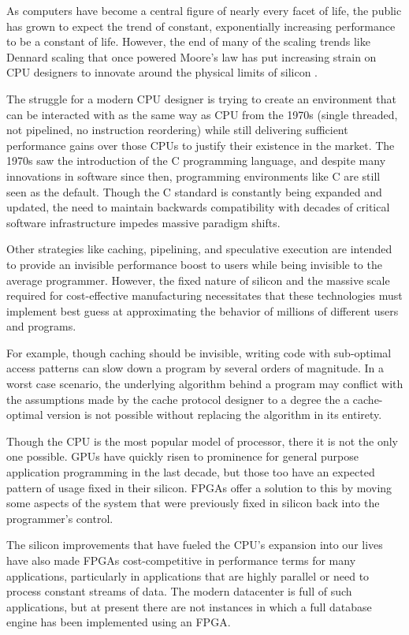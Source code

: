 
As computers have become a central figure of nearly every facet of life, the
public has grown to expect the trend of constant, exponentially increasing
performance to be a constant of life. However, the end of many of the scaling
trends like Dennard scaling that once powered Moore's law has put increasing
strain on CPU designers to innovate around the physical limits of silicon
\autocite{dark-silicon}.

The struggle for a modern CPU designer is trying to create an environment that
can be interacted with as the same way as CPU from the 1970s (single threaded,
not pipelined, no instruction reordering) while still delivering sufficient
performance gains over those CPUs to justify their existence in the market. The
1970s saw the introduction of the C programming language, and despite many
innovations in software since then, programming environments like C are still
seen as the default. Though the C standard is constantly being expanded and
updated, the need to maintain backwards compatibility with decades of critical
software infrastructure impedes massive paradigm shifts.

Other strategies like caching, pipelining, and speculative execution are
intended to provide an invisible performance boost to users while being
invisible to the average programmer. However, the fixed nature of silicon and
the massive scale required for cost-effective manufacturing necessitates that
these technologies must implement best guess at approximating the behavior of
millions of different users and programs.

For example, though caching should be invisible, writing code with sub-optimal
access patterns can slow down a program by several orders of magnitude. In a
worst case scenario, the underlying algorithm behind a program may conflict with
the assumptions made by the cache protocol designer to a degree the a
cache-optimal version is not possible without replacing the algorithm in its
entirety.

Though the CPU is the most popular model of processor, there it is not the only
one possible. GPUs have quickly risen to prominence for general purpose
application programming in the last decade, but those too have an expected
pattern of usage fixed in their silicon. FPGAs offer a solution to this by
moving some aspects of the system that were previously fixed in silicon back
into the programmer's control.

The silicon improvements that have fueled the CPU's expansion into our lives
have also made FPGAs cost-competitive in performance terms for many
applications, particularly in applications that are highly parallel or need to
process constant streams of data. The modern datacenter is full of such
applications, but at present there are not instances in which a full database
engine has been implemented using an FPGA.
